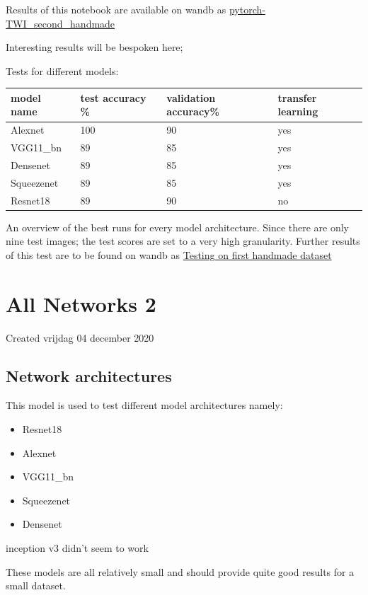 Results of this notebook are available on wandb as \href{https://wandb.ai/dplars/pytorch-TWI_second_handmade?workspace=user-dplars}{pytorch-TWI\_second\_handmade}



Interesting results will be bespoken here;

Tests for different models: 

\begin{tabular}{ |l|l|l|l| }
\hline
 model name & test accuracy \% & validation accuracy\% & transfer learning \tabularnewline
\hline
\hline
 Alexnet & 100 & 90 & yes \tabularnewline
\hline
 VGG11\_bn & 89 & 85 & yes \tabularnewline
\hline
 Densenet & 89 & 85 & yes \tabularnewline
\hline
 Squeezenet & 89 & 85 & yes \tabularnewline
\hline
 Resnet18 & 89 & 90 & no \tabularnewline
\hline
\end{tabular}
										

An overview of the best runs for every model architecture. Since there are only nine test images; the test scores are set to a very high granularity. Further results of this test are to be found on wandb as \href{https://wandb.ai/dplars/pytorch-TWI_second_handmade/reports/Testing-on-first-handmade-dataset--VmlldzozNTE5NzM}{Testing on first handmade dataset}


		\section{All Networks 2}

Created vrijdag 04 december 2020



\subsection{Network architectures}

This model is used to test different model architectures namely:

\begin{itemize}
\item Resnet18
\item Alexnet
\item VGG11\_bn
\item Squeezenet
\item Densenet
\end{itemize}


inception v3 didn't seem to work



These models are all relatively small and should provide quite good results for a small dataset. 

